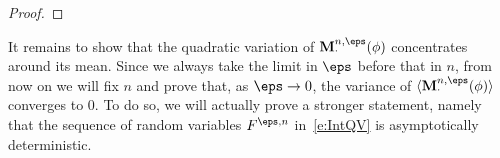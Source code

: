 \documentclass[reqno,11pt]{preprint}
\newcommand{\vN}{v^{\eps,n}}
\renewcommand{\E}{\mathbb{E}}
\newcommand{\BM}{\mathbf{M}}
\newcommand{\cD}{\mathcal{D}}
\newcommand{\cL}{\mathcal{L}}
\newcommand{\1}{\mathds{1}}
\newcommand{\Mn}{\BM^{n,\eps}}
\newcommand{\gensy}{\cL_0}
\def\giuseppe#1{\comment[darkred]{GC: #1}}
\begin{document}
\begin{proof}
\end{proof}  

It remains to show that the quadratic variation of $\Mn_\cdot(\phi)$ concentrates around its mean. 
Since we always take the limit 
in $\eps$ before that in $n$, from now on we will fix $n$ and prove that, as $\eps\to0$, 
the variance of $\langle\Mn_\cdot(\phi)\rangle$ converges to $0$. 
To do so, we will actually prove a stronger statement, namely that the sequence of random 
variables $F^{\eps,n}$ in~\eqref{e:IntQV} is asymptotically deterministic. 
\end{document}
